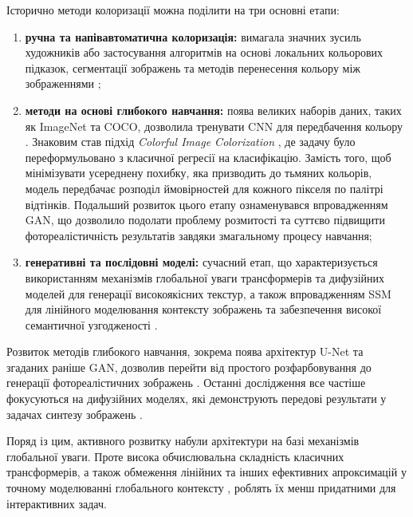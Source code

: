         Історично методи колоризації можна поділити на три основні етапи:
        \begin{enumerate}
            \item \textbf{ручна та напівавтоматична колоризація:}
                вимагала значних зусиль художників або застосування алгоритмів на основі локальних кольорових підказок, сегментації зображень та методів перенесення кольору між зображеннями \cite{2004-colorization-using-optimization,2001-reinhard-color-transfer,2002-welsh-transferring-color};
            \item \textbf{методи на основі глибокого навчання:}
                поява великих наборів даних, таких як ImageNet та COCO, дозволила тренувати CNN для передбачення кольору \cite{2016-deep-learning}.
                Знаковим став підхід \textit{Colorful Image Colorization} \cite{2016-colorful-image-colorization}, де задачу було переформульовано з класичної регресії на класифікацію.
                Замість того, щоб мінімізувати усереднену похибку, яка призводить до тьмяних кольорів, модель передбачає розподіл ймовірностей для кожного пікселя по палітрі відтінків.
                Подальший розвиток цього етапу ознаменувався впровадженням GAN, що дозволило подолати проблему розмитості та суттєво підвищити фотореалістичність результатів завдяки змагальному процесу навчання;
            \item \textbf{генеративні та послідовні моделі:} сучасний етап,
            що характеризується використанням механізмів глобальної уваги трансформерів та дифузійних моделей для генерації високоякісних текстур,
            а також впровадженням SSM для лінійного моделювання контексту зображень та забезпечення високої семантичної узгодженості \cite{2023-diffusion-models-survey, 2023-mamba}.
        \end{enumerate}

        Розвиток методів глибокого навчання, зокрема поява архітектур U-Net та згаданих раніше GAN, дозволив перейти від простого розфарбовування до генерації фотореалістичних зображень \cite{2017-image-to-image-translation}. 
        Останні дослідження все частіше фокусуються на дифузійних моделях, які демонструють передові результати у задачах синтезу зображень \cite{2022-palette-image-to-image-diffusion-models}. 
        
        Поряд із цим, активного розвитку набули архітектури на базі механізмів глобальної уваги.
        Проте висока обчислювальна складність класичних трансформерів, а також обмеження лінійних та інших ефективних апроксимацій у точному моделюванні глобального контексту \cite{2021-long-range-arena, 2022-efficient-transformers-survey},
        роблять їх менш придатними для інтерактивних задач.

